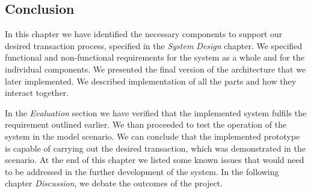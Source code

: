 \subsection{Conclusion}

In this chapter we have identified the necessary components to support our desired transaction process, specified in the \textit{System Design} chapter. We specified functional and non-functional requirements for the system as a whole and for the individual components. We presented the final version of the architecture that we later implemented. We described implementation of all the parts and how they interact together.

In the \textit{Evaluation} section we have verified that the implemented system fulfils the requirement outlined earlier. We than proceeded to test the operation of the system in the model scenario. We can conclude that the implemented prototype is capable of carrying out the desired transaction, which was demonstrated in the scenario. At the end of this chapter we listed some known issues that would need to be addressed in the further development of the system. In the following chapter \textit{Discussion}, we debate the outcomes of the project.